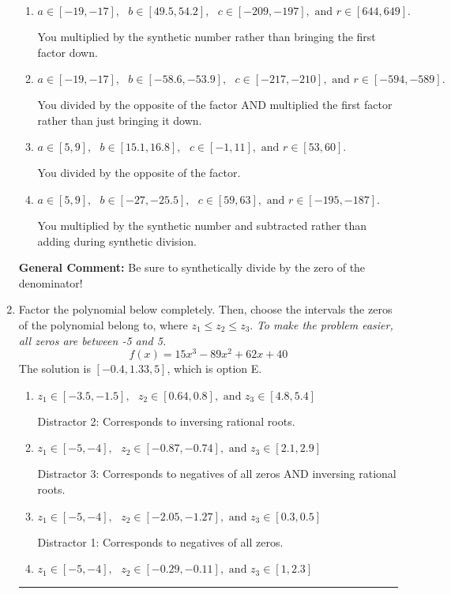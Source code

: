 \documentclass{extbook}[14pt]
\newcommand{\litem}[1]{\item #1

\rule{\textwidth}{0.4pt}}
\begin{document}
\begin{enumerate}
{\begin{enumerate}[label=\Alph*.]
* This is the solution!
\item \( a \in [-19, -17], \text{   } b \in [49.5, 54.2], \text{   } c \in [-209, -197], \text{   and   } r \in [644, 649]. \)

 You multiplied by the synthetic number rather than bringing the first factor down.
\item \( a \in [-19, -17], \text{   } b \in [-58.6, -53.9], \text{   } c \in [-217, -210], \text{   and   } r \in [-594, -589]. \)

 You divided by the opposite of the factor AND multiplied the first factor rather than just bringing it down.
\item \( a \in [5, 9], \text{   } b \in [15.1, 16.8], \text{   } c \in [-1, 11], \text{   and   } r \in [53, 60]. \)

 You divided by the opposite of the factor.
\item \( a \in [5, 9], \text{   } b \in [-27, -25.5], \text{   } c \in [59, 63], \text{   and   } r \in [-195, -187]. \)

 You multiplied by the synthetic number and subtracted rather than adding during synthetic division.
\end{enumerate}

\textbf{General Comment:} Be sure to synthetically divide by the zero of the denominator!
}
\litem{
Factor the polynomial below completely. Then, choose the intervals the zeros of the polynomial belong to, where $z_1 \leq z_2 \leq z_3$. \textit{To make the problem easier, all zeros are between -5 and 5.}
\[ f(x) = 15x^{3} -89 x^{2} +62 x + 40 \]The solution is \( [-0.4, 1.33, 5] \), which is option E.\begin{enumerate}[label=\Alph*.]
\item \( z_1 \in [-3.5, -1.5], \text{   }  z_2 \in [0.64, 0.8], \text{   and   } z_3 \in [4.8, 5.4] \)

 Distractor 2: Corresponds to inversing rational roots.
\item \( z_1 \in [-5, -4], \text{   }  z_2 \in [-0.87, -0.74], \text{   and   } z_3 \in [2.1, 2.9] \)

 Distractor 3: Corresponds to negatives of all zeros AND inversing rational roots.
\item \( z_1 \in [-5, -4], \text{   }  z_2 \in [-2.05, -1.27], \text{   and   } z_3 \in [0.3, 0.5] \)

 Distractor 1: Corresponds to negatives of all zeros.
\item \( z_1 \in [-5, -4], \text{   }  z_2 \in [-0.29, -0.11], \text{   and   } z_3 \in [1, 2.3] \)


\end{enumerate}}
\end{enumerate}
\end{document}
